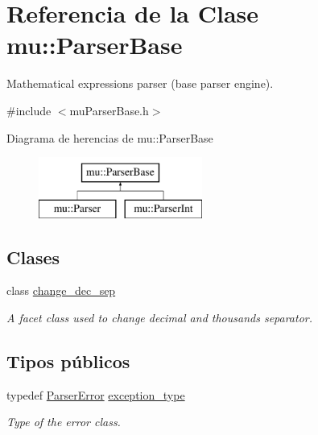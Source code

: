 \hypertarget{classmu_1_1_parser_base}{}\section{Referencia de la Clase mu\+:\+:Parser\+Base}
\label{classmu_1_1_parser_base}


Mathematical expressions parser (base parser engine).  




{\ttfamily \#include $<$mu\+Parser\+Base.\+h$>$}

Diagrama de herencias de mu\+:\+:Parser\+Base\begin{figure}[H]
\begin{center}
\leavevmode
\includegraphics[height=2.000000cm]{classmu_1_1_parser_base}
\end{center}
\end{figure}
\subsection*{Clases}
\begin{DoxyCompactItemize}
\item 
class \hyperlink{classmu_1_1_parser_base_1_1change__dec__sep}{change\+\_\+dec\+\_\+sep}
\begin{DoxyCompactList}\small\item\em A facet class used to change decimal and thousands separator. \end{DoxyCompactList}\end{DoxyCompactItemize}
\subsection*{Tipos públicos}
\begin{DoxyCompactItemize}
\item 
typedef \hyperlink{classmu_1_1_parser_error}{Parser\+Error} \hyperlink{classmu_1_1_parser_base_ab385f37be00cee7d8a68c3c41f6a5b64}{exception\+\_\+type}
\begin{DoxyCompactList}\small\item\em Type of the error class. \end{DoxyCompactList}\end{DoxyCompactItemize}
